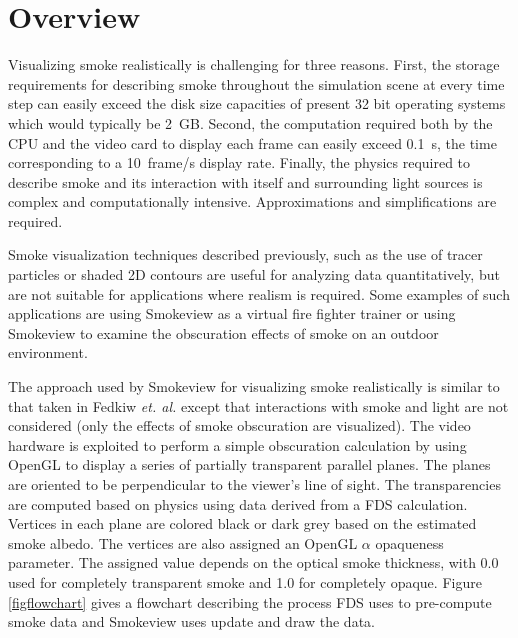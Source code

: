\documentclass[11pt,twoside]{book}
\begin{document}
\chapter{Overview}
Visualizing smoke realistically is challenging for three reasons.
First, the storage requirements for describing smoke throughout the
simulation scene at every time step can easily exceed the disk
size capacities of present 32 bit operating systems which would
typically be 2~GB. Second, the computation required both by the CPU and
the video card to display each frame can easily exceed 0.1~s, the
time corresponding to a 10~frame/s display rate. Finally, the physics
required to describe smoke and its interaction with itself and
surrounding light sources is complex and computationally
intensive. Approximations and simplifications are required.

Smoke visualization techniques described previously, such as the
use of tracer particles or shaded 2D contours are useful for
analyzing data quantitatively, but are not suitable for
applications where realism is required. Some examples of such
applications are using Smokeview as a virtual fire fighter trainer
or using Smokeview to examine the obscuration effects of smoke on
an outdoor environment.

The approach used by Smokeview for visualizing smoke realistically
is similar to that taken in Fedkiw {\em et. al.}\cite{fedkiw:01}
except that interactions with smoke and light are not considered (only the effects of smoke obscuration are visualized).  The video hardware
is exploited to perform a simple obscuration calculation by using
OpenGL to display a series of partially transparent parallel
planes.  The planes are oriented to be perpendicular to the
viewer's line of sight. The transparencies are computed based on
physics using data derived from a FDS calculation. Vertices in
each plane are colored black or dark grey based on the estimated
smoke albedo. The vertices are also assigned an OpenGL
$\alpha$ opaqueness parameter. The assigned value depends on
the optical smoke thickness, with 0.0 used for completely
transparent smoke and 1.0 for completely opaque.
Figure \ref{figflowchart} gives a flowchart describing the process FDS uses to pre-compute smoke data and
Smokeview uses update and draw the data.


\end{document}
